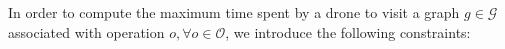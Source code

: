 \documentclass[10pt,a4paper]{elsarticle}
\begin{document}

\noindent
In order to compute the maximum time spent by a drone to visit a graph $g \in \mathcal G$ associated with operation $o,\forall o \in \mathcal O$, we introduce the following constraints:
\end{document}
